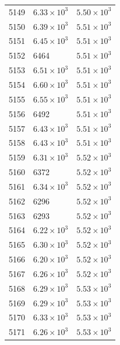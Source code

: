 \begin{table}[H]
\begin{tabular}{lll}
5149 & $\displaystyle 6.33 \times 10^{3}$ & $\displaystyle 5.50 \times 10^{3}$ \\
5150 & $\displaystyle 6.39 \times 10^{3}$ & $\displaystyle 5.51 \times 10^{3}$ \\
5151 & $\displaystyle 6.45 \times 10^{3}$ & $\displaystyle 5.51 \times 10^{3}$ \\
5152 & 6464 & $\displaystyle 5.51 \times 10^{3}$ \\
5153 & $\displaystyle 6.51 \times 10^{3}$ & $\displaystyle 5.51 \times 10^{3}$ \\
5154 & $\displaystyle 6.60 \times 10^{3}$ & $\displaystyle 5.51 \times 10^{3}$ \\
5155 & $\displaystyle 6.55 \times 10^{3}$ & $\displaystyle 5.51 \times 10^{3}$ \\
5156 & 6492 & $\displaystyle 5.51 \times 10^{3}$ \\
5157 & $\displaystyle 6.43 \times 10^{3}$ & $\displaystyle 5.51 \times 10^{3}$ \\
5158 & $\displaystyle 6.43 \times 10^{3}$ & $\displaystyle 5.51 \times 10^{3}$ \\
5159 & $\displaystyle 6.31 \times 10^{3}$ & $\displaystyle 5.52 \times 10^{3}$ \\
5160 & 6372 & $\displaystyle 5.52 \times 10^{3}$ \\
5161 & $\displaystyle 6.34 \times 10^{3}$ & $\displaystyle 5.52 \times 10^{3}$ \\
5162 & 6296 & $\displaystyle 5.52 \times 10^{3}$ \\
5163 & 6293 & $\displaystyle 5.52 \times 10^{3}$ \\
5164 & $\displaystyle 6.22 \times 10^{3}$ & $\displaystyle 5.52 \times 10^{3}$ \\
5165 & $\displaystyle 6.30 \times 10^{3}$ & $\displaystyle 5.52 \times 10^{3}$ \\
5166 & $\displaystyle 6.20 \times 10^{3}$ & $\displaystyle 5.52 \times 10^{3}$ \\
5167 & $\displaystyle 6.26 \times 10^{3}$ & $\displaystyle 5.52 \times 10^{3}$ \\
5168 & $\displaystyle 6.29 \times 10^{3}$ & $\displaystyle 5.53 \times 10^{3}$ \\
5169 & $\displaystyle 6.29 \times 10^{3}$ & $\displaystyle 5.53 \times 10^{3}$ \\
5170 & $\displaystyle 6.33 \times 10^{3}$ & $\displaystyle 5.53 \times 10^{3}$ \\
5171 & $\displaystyle 6.26 \times 10^{3}$ & $\displaystyle 5.53 \times 10^{3}$ \\

\end{tabular}
\end{table}
